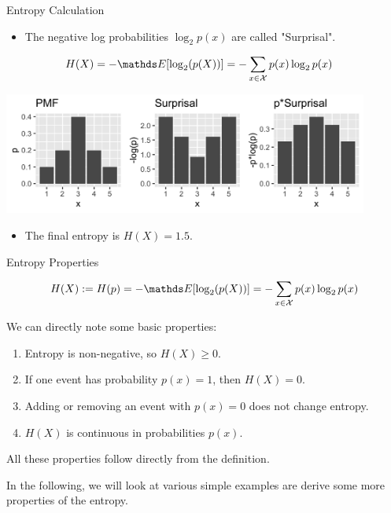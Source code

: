 \documentclass[11pt,compress,t,notes=noshow, xcolor=table]{beamer}
\begin{document}
\begin{vbframe}{Entropy Calculation}

  \begin{itemize}
  \item The negative log probabilities $\log_2 p(x)$ are called "Surprisal".
  \end{itemize}

\begin{equation*}
\begin{aligned} 
  H(X) = - \E[\log_2(p(X))]           &= -\sum_{x \in \Xspace} p(x) \log_2 p(x) 
\end{aligned} 
\end{equation*}

\begin{center}
\includegraphics[width = 12cm ]{figure/entropy_calc.png} \\
\end{center}

  \begin{itemize}
  \item The final entropy is $H(X)=1.5$.
  \end{itemize}

\end{vbframe}

\begin{vbframe}{Entropy Properties}

$$H(X) := H(p) = - \E[\log_2(p(X))] = -\sum_{x \in \Xspace} p(x) \log_2 p(x)$$

We can directly note some basic properties:
\vspace{0.2cm}
  \begin{enumerate}
  \setlength\itemsep{1.2em} 
    \item Entropy is non-negative, so $H(X) \geq 0$.
    \item If one event has probability $p(x) = 1$, then $H(X)=0$. 
    \item Adding or removing an event with $p(x)=0$ does not change entropy.
    \item $H(X)$ is continuous in probabilities $p(x)$.
  \end{enumerate}
\vspace{0.2cm}  
All these properties follow directly from the definition.

\vspace{0.2cm}

In the following, we will look at various simple examples are derive some more properties of the entropy.

\end{vbframe}
\end{document}

